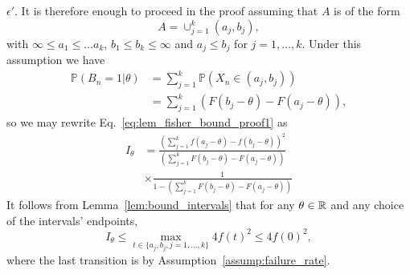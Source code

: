 \begin{proof-of-lemma}[\ref{lem:fisher_bound}]
  $\epsilon'$. It is therefore enough to proceed in the proof assuming that
  $A$ is of the form
  \begin{equation*}
    A = \cup_{j=1}^k (a_j,b_j),
  \end{equation*}
  with $\infty \leq a_1 \leq \ldots a_k$, $b_1 \leq b_k \leq \infty$ and $a_j \leq b_j$ for $j=1,\ldots,k$. Under this assumption we have
  \begin{align*}
    \mathbb P(B_n=1| \theta) & = \sum_{j=1}^k \mathbb P\left(X_n \in (a_j,b_j) \right)  \\
    & = \sum_{j=1}^k \left( F \left(b_j-\theta\right) -  F \left(a_j-\theta\right)  \right),
  \end{align*}
  so we may rewrite Eq.~\eqref{eq:lem_fisher_bound_proof1} as
  \begin{align*}
    I_\theta & =   \frac { \left( \sum_{j=1}^{k} f \left(a_j-\theta \right) - f \left( b_j-\theta \right)  \right)^2 } 
    { \left( \sum_{j=1}^k F \left( b_j-\theta \right) - F \left( a_j-\theta \right)  \right) }  \nonumber \\
    & \times \frac {1} 
    {1- \left( \sum_{j=1}^k F \left(  b_j-\theta \right) - F \left( a_j-\theta \right)  \right) } 
  \end{align*}
  It follows from Lemma~\ref{lem:bound_intervals} that for any $\theta \in
  \mathbb{R}$ and any choice of the intervals' endpoints,
  \begin{equation*}
    I_\theta \le
    \max_{t \in \{a_j,b_j, j=1,\ldots,k\} } 4f(t)^2 \leq 4 f(0)^2, 
  \end{equation*}
  where the last transition is by Assumption~\ref{assump:failure_rate}. 
\end{proof-of-lemma}


